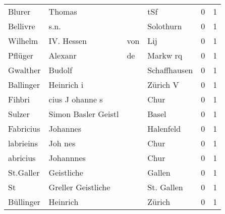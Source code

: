 \begin{center}
\begin{tiny}
\begin{longtabu}{llllrr}
                   Blurer &                             Thomas &             &                                         tSf &          0 &         1 \\
                 Bellivre &                               s.n. &             &                                   Solothurn &          0 &         1 \\
                  Wilhelm &                        IV.  Hessen &         von &                                         Lij &          0 &         1 \\
                  Pflüger &                            Alexanr &          de &                                    Markw rq &          0 &         1 \\
                 Gwalther &                             Budolf &             &                                Schaffhausen &          0 &         1 \\
                Ballinger &                         Heinrich i &             &                                    Zürich V &          0 &         1 \\
                   Fihbri &                    cius J ohanne s &             &                                        Chur &          0 &         1 \\
                   Sulzer &                Simon Basler Geistl &             &                                       Basel &          0 &         1 \\
                Fabricius &                           Johannes &             &                                   Halenfeld &          0 &         1 \\
                labrieins &                            Joh nes &             &                                        Chur &          0 &         1 \\
                 abricius &                          Johannnes &             &                                        Chur &          0 &         1 \\
                St.Galler &                         Geistliche &             &                                      Gallen &          0 &         1 \\
                       St &                 Greller Geistliche &             &                                  St. Gallen &          0 &         1 \\
                Büllinger &                           Heinrich &             &                                      Zürich &          0 &         1 \\

\end{longtabu}
\end{tiny}
\end{center}
